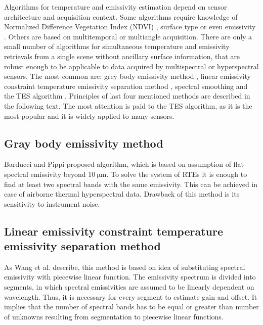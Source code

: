 Algorithms for temperature and emissivity estimation depend on sensor architecture and acquisition context. Some algorithms require knowledge of Normalized Difference Vegetation Index (NDVI) \cite{sobrino-towards-2000}, surface type \cite{snyder-classification-1998} or even emissivity \cite{jimenez-munoz-revisions-2009}. Others are based on multitemporal \cite{wan-new-2000} or multiangle \cite{soria-derived-2007} acquisition. There are only a small number of algorithms for simultaneous temperature and emissivity retrievals from a single scene without ancillary surface information, that are robust enough to be applicable to data acquired by multispectral or hyperspectral sensors. The most common are: grey body emissivity method \cite{BP96}, linear emissivity constraint temperature emissivity separation method \cite{WW11}, spectral smoothing \cite{B07} and the TES algorithm \cite{GR98}. Principles of last four mentioned methods are described in the following text. The most attention is paid to the TES algorithm, as it is the most popular and it is widely applied to many sensors.

\subsection*{Gray body emissivity method}

Barducci and Pippi \cite{BP96} proposed algorithm, which is based on assumption of flat spectral emissivity beyond $\SI{10}{\micro\meter}$. To solve the system of RTEs it is enough to find at least two spectral bands with the same emissivity. This can be achieved in case of airborne thermal hyperspectral data. Drawback of this method is its sensitivity to instrument noise.

\subsection*{Linear emissivity constraint temperature emissivity separation method}

As Wang et al. \cite{WW11} describe, this method is based on idea of substituting spectral emissivity with piecewise linear function. The emissivity spectrum is divided into segments, in which spectral emissivities are assumed to be linearly dependent on wavelength. Thus, it is necessary for every segment to estimate gain and offset. It implies that the number of spectral bands has to be equal or greater than number of unknowns resulting from segmentation to piecewise linear functions.

